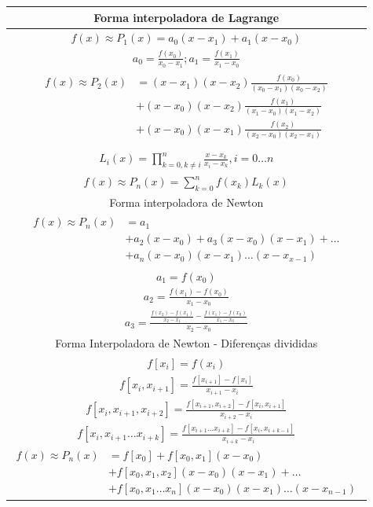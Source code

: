 \documentclass{article}
\begin{document}
\hfill
\noindent
\begin{minipage}[!t]{.5\textwidth}
\begin{tabularx}{\textwidth}{c}
\toprule
Forma interpoladora de Lagrange\\
\midrule
$f(x) \approx P_1(x) = a_0(x-x_1) + a_1(x-x_0)$\\
$a_0 = \frac{f(x_0)}{x_0-x_1} ; a_1 = \frac{f(x_1)}{x_1-x_0}$ \\
$\begin{aligned}
f(x) \approx P_2(x) &= (x-x_1)(x-x_2)\frac{f(x_0)}{(x_0-x_1)(x_0-x_2)}\\ 
&+ (x-x_0)(x-x_2)\frac{f(x_1)}{(x_1-x_0)(x_1-x_2)} \\
&+ (x-x_0)(x-x_1)\frac{f(x_2)}{(x_2-x_0)(x_2-x_1)}\\
\end{aligned}$\\
\hline
$ L_i(x) = \displaystyle\prod_{k=0,k \neq i}^{n} \frac{x-x_k}{x_i-x_k} , i = 0 \dots n$\\
$f(x) \approx P_n(x)= \displaystyle\sum_{k=0}^n f(x_k)L_k(x)$\\
\midrule
Forma interpoladora de Newton\\
\midrule
$\begin{aligned}
f(x) \approx P_n(x) &= a_1 \\
&+ a_2(x-x_0) + a_3(x-x_0)(x-x_1) + \dots\\
&+ a_n(x-x_0)(x-x_1)\dots(x-x_{x-1})
\end{aligned}$\\
$a_1 = f(x_0)$\\
$a_2 = \frac{f(x_1)-f(x_0)}{x_1-x_0}$\\
$a_3 = \frac{ \frac{f(x_2)-f(x_1)}{x_2-x_1} - \frac{f(x_1)-f(x_0)}{x_1-x_0}   }{x_2-x_0}$\\
\midrule
Forma Interpoladora de Newton - Diferenças divididas\\
\midrule
$f[x_i] = f(x_i)$\\
$f[x_i,x_{i+1}] = \frac{f[x_{i+1}] - f[x_i]}{x_{i+1}-x_i}$\\

$f[x_i,x_{i+1},x_{i+2}] = \frac{f[x_{i+1},x_{i+2}] - f[x_i,x_{i+1}]}{x_{i+2} - x_i}$\\


$f[x_i,x_{i+1}\dotsc x_{i+k}] = \frac{ f[x_{i+1}\dotsc x_{i+k}] - f[ x_i, x_{i+k-1} ]   }{x_{i+k} - x_i}$\\
$\begin{aligned}
f(x) \approx P_n(x) &= f[x_0] + f[x_0,x_1](x-x_0) \\
&+ f[x_0,x_1,x_2](x-x_0)(x-x_1) + \dots\\
&+ f[x_0,x_1 \dotsc x_n](x-x_0)(x-x_1)\dots(x-x_{n-1})
\end{aligned}$\\



\end{tabularx}
\end{minipage}
\end{document}
